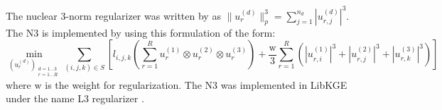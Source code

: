\begin{table}[!htbp]
\centering
{}
\caption[The best ComplEx configurations]{The best ComplEx configurations found by \citet{chen2021relation}. The MRR is the entity MRR on the validation dataset.}
\label{tab:AKBC best models}
\end{table}


The nuclear 3-norm regularizer was written by \citet{lacroix2018canonical} as $\| u_r^{(d)} \|^3_p = \sum_{j=1}^{n_d}|u_{r,j}^{(d)}|^3$. The N3 is implemented by using this formulation of the form:  
\begin{equation}
\label{eq:minization function}
\min_{(u_r^{(d)})_{\substack{d=1\dots3 \\ r=1\dots R}}}\displaystyle\sum_{(i,j,k)\in \mathit{S}}[l_{i,j,k}(\displaystyle\sum_{r=1}^R u_r^{(1)} \otimes u_r^{(2)} \otimes u_r^{(3)}) + \frac{\mathrm{w}}{3}\displaystyle\sum_{r=1}^R (|u_{r,i}^{(1)}|^3 + |u_{r,j}^{(2)}|^3 + |u_{r,k}^{(3)}|^3)]
\end{equation} where $\mathrm{w}$ is the weight for regularization. The N3 was implemented in LibKGE under the name L3 regularizer \citep{Ruffinelli2020You}.

